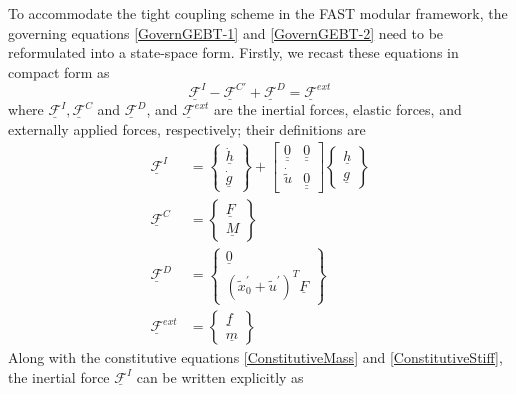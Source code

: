 \documentclass{aiaa-tc}
\renewcommand{\vec}[1]{\underline{#1}}
\begin{document}
To accommodate the tight coupling scheme in the FAST modular framework, the governing equations 
\eqref{GovernGEBT-1} and \eqref{GovernGEBT-2} need to be reformulated
into a state-space form. Firstly, we recast these equations in compact form
as
\begin{equation}
    \label{CompactGovernGEBT}
    \underline{\mathcal{F}}^I - \underline{\mathcal{F}}^{C\prime} + \underline{\mathcal{F}}^D = \underline{\mathcal{F}}^{ext}
\end{equation}
where $\underline{\mathcal{F}}^I, \underline{\mathcal{F}}^C$ and $\underline{\mathcal{F}}^D$, and $\underline{\mathcal{F}}^{ext}$ are the inertial forces, elastic forces, and externally applied forces, respectively; their definitions are
\begin{align}
    \label{InertialForce}
    \underline{\mathcal{F}}^I &= \begin{Bmatrix}
    \dot{\underline{h}} \\
    \dot{\underline{g}}
    \end{Bmatrix}
    + \begin{bmatrix}
    \underline{\underline{0}} & \underline{\underline{0}} \\
    \dot{\tilde{u}}  &  \underline{\underline{0}}
    \end{bmatrix}
    \begin{Bmatrix}
    \vec{h} \\
    \vec{g}
    \end{Bmatrix} \\
    \label{ElasticForceFc}
     \underline{\mathcal{F}}^C &= \begin{Bmatrix}
    \underline{F} \\
    \underline{M}
    \end{Bmatrix} \\
    \label{ElasticForceFd}
    \underline{\mathcal{F}}^D &= \begin{Bmatrix}
    \underline{0} \\
    (\tilde{x}^\prime_0 + \tilde{u}^\prime)^T \underline{F}
    \end{Bmatrix} \\
    \label{AppliedForce}
    \underline{\mathcal{F}}^{ext} &= \begin{Bmatrix}
    \underline{f} \\
    \underline{m}
    \end{Bmatrix}
\end{align}   
Along with the constitutive equations \eqref{ConstitutiveMass} and \eqref{ConstitutiveStiff}, the inertial force $\underline{\mathcal{F}}^I$ can be written explicitly as
\end{document}
